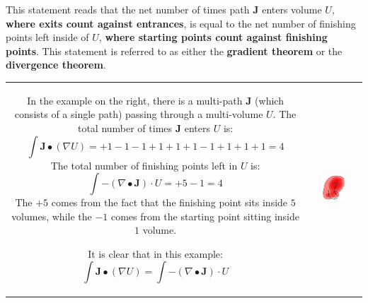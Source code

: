 This statement reads that the net number of times path \(\mathbf{J}\) enters volume \(U\), {\bf where exits count against entrances}, is equal to the net number of finishing points left inside of \(U\), {\bf where starting points count against finishing points}. This statement is referred to as either the {\bf gradient theorem} or the {\bf divergence theorem}.

\begin{tabular}{cc}
\parbox{0.5\textwidth}{
In the example on the right, there is a multi-path \(\mathbf{J}\) (which consists of a single path) passing through a multi-volume \(U\). The total number of times \(\mathbf{J}\) enters \(U\) is: 
\[\int \mathbf{J} \bullet (\nabla U) = +1 - 1 - 1 + 1 + 1 + 1 - 1 + 1 + 1 + 1 = 4\] 
The total number of finishing points left in \(U\) is:
\[\int -(\nabla \bullet \mathbf{J}) \cdot U = +5 - 1 = 4\]
The \(+5\) comes from the fact that the finishing point sits inside \(5\) volumes, while the \(-1\) comes from the starting point sitting inside \(1\) volume.

It is clear that in this example:
 \[\int \mathbf{J} \bullet (\nabla U) = \int -(\nabla \bullet \mathbf{J}) \cdot U\]

} & \parbox{0.5\textwidth}{
\includegraphics[width = 0.5\textwidth]{Boundaries/Path_endpoints/Gradient_theorem}
}
\end{tabular}

